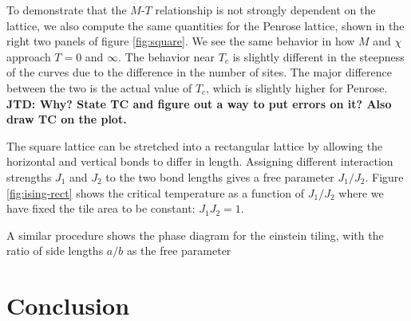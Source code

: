 \documentclass[amsmath,amssymb,aps,twocolumn,nofootinbib]{revtex4-2}
\newcommand{\jtd}[1]{{\color{red}\textbf{JTD: #1}}}
\begin{document}
To demonstrate that the $M$-$T$ relationship is not strongly dependent on the lattice, we also compute the same quantities for the Penrose lattice, shown in the right two panels of figure \ref{fig:square}. We see the same behavior in how $M$ and $\chi$ approach $T=0$ and $\infty$. The behavior near $T_c$ is slightly different in the steepness of the curves due to the difference in the number of sites. The major difference between the two is the actual value of $T_c$, which is slightly higher for Penrose. \jtd{Why? State TC and figure out a way to put errors on it? Also draw TC on the plot.}

The square lattice can be stretched into a rectangular lattice by allowing the horizontal and vertical bonds to differ in length. Assigning different interaction strengths $J_1$ and $J_2$ to the two bond lengths gives a free parameter $J_1/J_2$. Figure \ref{fig:ising-rect} shows the critical temperature as a function of $J_1/J_2$ where we have fixed the tile area to be constant: $J_1J_2 = 1$.

A similar procedure shows the phase diagram for the einstein tiling, with the ratio of side lengths $a/b$ as the free parameter

\section{Conclusion}


\end{document}
